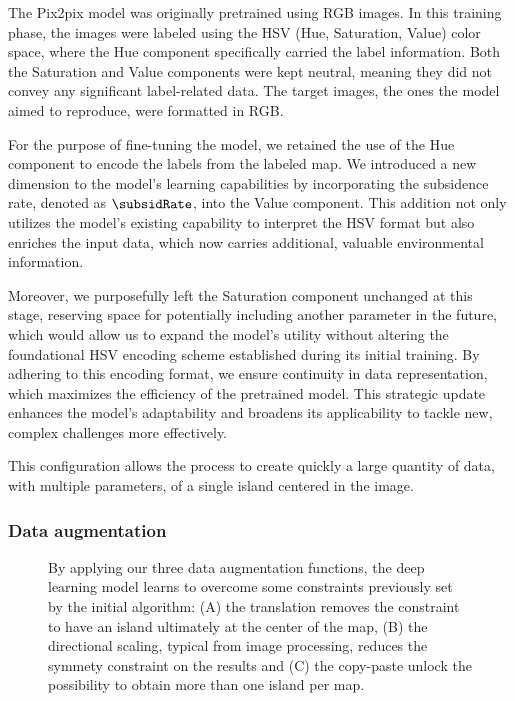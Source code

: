 The Pix2pix model was originally pretrained using RGB images. In this training phase, the images were labeled using the HSV (Hue, Saturation, Value) color space, where the Hue component specifically carried the label information. Both the Saturation and Value components were kept neutral, meaning they did not convey any significant label-related data. The target images, the ones the model aimed to reproduce, were formatted in RGB.

For the purpose of fine-tuning the model, we retained the use of the Hue component to encode the labels from the labeled map. We introduced a new dimension to the model's learning capabilities by incorporating the subsidence rate, denoted as $\subsidRate$, into the Value component. This addition not only utilizes the model's existing capability to interpret the HSV format but also enriches the input data, which now carries additional, valuable environmental information.

Moreover, we purposefully left the Saturation component unchanged at this stage, reserving space for potentially including another parameter in the future, which would allow us to expand the model's utility without altering the foundational HSV encoding scheme established during its initial training. By adhering to this encoding format, we ensure continuity in data representation, which maximizes the efficiency of the pretrained model. This strategic update enhances the model's adaptability and broadens its applicability to tackle new, complex challenges more effectively.

This configuration allows the process to create quickly a large quantity of data, with multiple parameters, of a single island centered in the image. 

\subsubsection{Data augmentation}
\begin{figure}
    \caption{By applying our three data augmentation functions, the deep learning model learns to overcome some constraints previously set by the initial algorithm: (A) the translation removes the constraint to have an island ultimately at the center of the map, (B) the directional scaling, typical from image processing, reduces the symmety constraint on the results and (C) the copy-paste unlock the possibility to obtain more than one island per map.}
    \label{fig:coral-island_data-augmentation-examples}
\end{figure}


